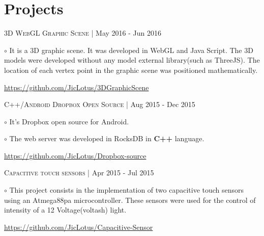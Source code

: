 \documentclass[letterpaper]{article}
\renewenvironment{itemize}{
  \begin{list}{}{
    \setlength{\leftmargin}{1.5em}
  }
}{
  \end{list}
}
\newenvironment{no-indent-itemize}{
  \begin{list}{}{
    \setlength{\leftmargin}{0em}
  }
}{
  \end{list}
}
\def\bullet{$\circ$\xspace}
\begin{document}
\section*{Projects}
\begin{no-indent-itemize}
    
    \item \textsc{3D WebGL Graphic Scene} | May 2016 - Jun 2016
    \begin{itemize}
    \item\bullet It is a 3D graphic scene. It was developed in WebGL and Java Script. The 3D models were developed without any model external library(such as ThreeJS). The location of each vertex point in the graphic scene was positioned mathematically.
    \end{itemize}
    \begin{itemize}
    \item \href{https://github.com/JicLotus/3DGraphicScene}{https://github.com/JicLotus/3DGraphicScene}
    
    \end{itemize}

    \item \textsc{C++/Android Dropbox Open Source} | Aug 2015 - Dec 2015
    \begin{itemize}
        \item\bullet It's Dropbox open source for Android.
        \item\bullet The web server was developed in RocksDB in \textbf{C++} language.
        \end{itemize}    
    \begin{itemize}
        \item \href{https://github.com/JicLotus/Dropbox-source}{https://github.com/JicLotus/Dropbox-source}
    \end{itemize}

    \item \textsc{Capacitive touch sensors} |  Apr 2015 - Jul 2015

    \begin{itemize}
        \item\bullet This project consists in the implementation of two capacitive touch sensors using an Atmega88pa microcontroller. These sensors were used for the control of intensity of a 12 Voltage(voltash) light.
         
         \href{https://github.com/JicLotus/Capacitive-Sensor}{https://github.com/JicLotus/Capacitive-Sensor}
    \end{itemize}

\end{no-indent-itemize}
\end{document}
